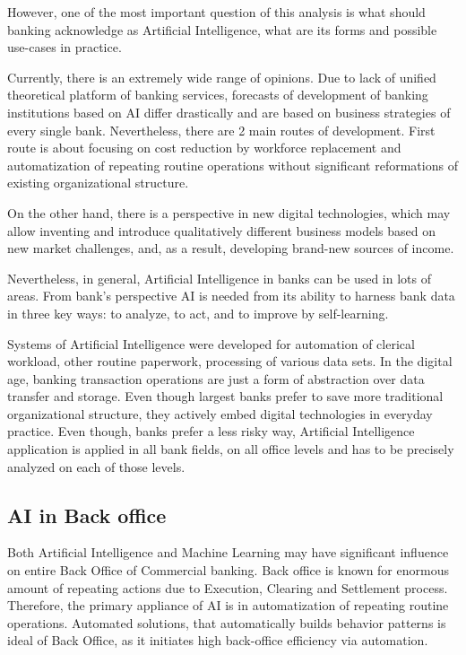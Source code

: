 However, one of the most important question of this analysis is what should banking acknowledge as Artificial Intelligence, what are its forms and possible use-cases in practice.

Currently, there is an extremely wide range of opinions.
Due to lack of unified theoretical platform of banking services, forecasts of development of banking institutions based on AI differ drastically and are based on business strategies of every single bank.
Nevertheless, there are 2 main routes of development.
First route is about focusing on cost reduction by workforce replacement and automatization of repeating routine operations without significant reformations of existing organizational structure.

On the other hand, there is a perspective in new digital technologies, which may allow inventing and introduce qualitatively different business models based on new market challenges, and, as a result, developing brand-new sources of income.
\cite{ai_reality_hype}

Nevertheless, in general, Artificial Intelligence in banks can be used in lots of areas.
From bank's perspective AI is needed from its ability to harness bank data in three key ways: to analyze, to act, and to improve by self-learning.

Systems of Artificial Intelligence were developed for automation of clerical workload, other routine paperwork, processing of various data sets.
In the digital age, banking transaction operations are just a form of abstraction over data transfer and storage.
Even though largest banks prefer to save more traditional organizational structure, they actively embed digital technologies in everyday practice.
Even though, banks prefer a less risky way, Artificial Intelligence application is applied in all bank fields, on all office levels and has to be precisely analyzed on each of those levels.



\subsection{AI in Back office}

Both Artificial Intelligence and Machine Learning may have significant influence on entire Back Office of Commercial banking.
Back office is known for enormous amount of repeating actions due to Execution, Clearing and Settlement process.
Therefore, the primary appliance of AI is in automatization of repeating routine operations.
Automated solutions, that automatically builds behavior patterns is ideal of Back Office, as it initiates high back-office efficiency via automation.

